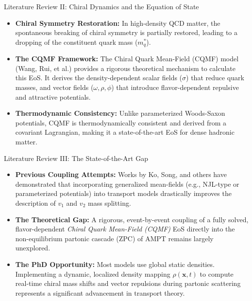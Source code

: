 \documentclass[aspectratio=169]{beamer}
\begin{document}
\begin{frame}{Literature Review II: Chiral Dynamics and the Equation of State}
    \begin{itemize}
        \item \textbf{Chiral Symmetry Restoration:} In high-density QCD matter, the spontaneous breaking of chiral symmetry is partially restored, leading to a dropping of the constituent quark mass ($m^*_q$).
        \item \textbf{The CQMF Framework:} The Chiral Quark Mean-Field (CQMF) model (Wang, Rui, et al.) provides a rigorous theoretical mechanism to calculate this EoS. It derives the density-dependent scalar fields ($\sigma$) that reduce quark masses, and vector fields ($\omega, \rho, \phi$) that introduce flavor-dependent repulsive and attractive potentials.
        \item \textbf{Thermodynamic Consistency:} Unlike parameterized Woods-Saxon potentials, CQMF is thermodynamically consistent and derived from a covariant Lagrangian, making it a state-of-the-art EoS for dense hadronic matter.
    \end{itemize}
\end{frame}

\begin{frame}{Literature Review III: The State-of-the-Art Gap}
    \begin{itemize}
        \item \textbf{Previous Coupling Attempts:} Works by Ko, Song, and others have demonstrated that incorporating generalized mean-fields (e.g., NJL-type or parameterized potentials) into transport models drastically improves the description of $v_1$ and $v_2$ mass splitting.
        \item \textbf{The Theoretical Gap:} A rigorous, event-by-event coupling of a fully solved, flavor-dependent \textit{Chiral Quark Mean-Field (CQMF)} EoS directly into the non-equilibrium partonic cascade (ZPC) of AMPT remains largely unexplored.
        \item \textbf{The PhD Opportunity:} Most models use global static densities. Implementing a dynamic, localized density mapping $\rho(\mathbf{x},t)$ to compute real-time chiral mass shifts and vector repulsions during partonic scattering represents a significant advancement in transport theory.
    \end{itemize}
\end{frame}
\end{document}
